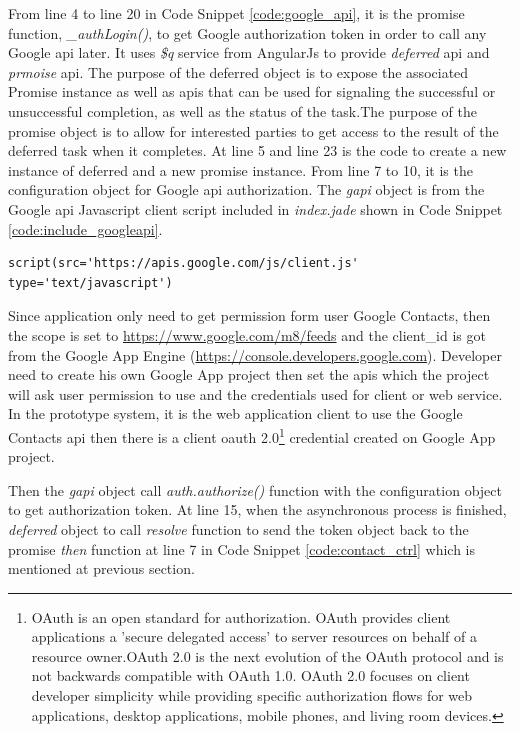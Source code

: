 \par From line 4 to line 20 in Code Snippet \ref{code:google_api}, it is the promise function, \textit{\_authLogin()}, to get Google authorization token in order to call any Google \gls{api} later. It uses \textit{\$q} service from AngularJs to provide \textit{deferred} \gls{api} and \textit{prmoise} \gls{api}. The purpose of the deferred object is to expose the associated Promise instance as well as \gls{api}s that can be used for signaling the successful or unsuccessful completion, as well as the status of the task.The purpose of the promise object is to allow for interested parties to get access to the result of the deferred task when it completes.\cite{angular:q} At line 5 and line 23 is the code to create a new instance of deferred and a new promise instance. From line 7 to 10, it is the configuration object for Google \gls{api} authorization. The \textit{gapi} object is from the Google \gls{api} Javascript client script included in \textit{index.jade} shown in Code Snippet \ref{code:include_googleapi}.

\begin{lstlisting}[caption={Include Google API Javascript file in Index.iade},label={code:include_googleapi}]
script(src='https://apis.google.com/js/client.js' type='text/javascript')
\end{lstlisting}

\par Since application only need to get permission form user Google Contacts, then the scope is set to \url{https://www.google.com/m8/feeds} and the client\_id is got from the Google App Engine (\url{https://console.developers.google.com}). Developer need to create his own Google App project then set the \gls{api}s which the project will ask user permission to use and the credentials used for client or web service. In the prototype system, it is the web application client to use the Google Contacts \gls{api} then there is a client \gls{oauth} 2.0\footnote{OAuth is an open standard for authorization. OAuth provides client applications a 'secure delegated access' to server resources on behalf of a resource owner.OAuth 2.0 is the next evolution of the OAuth protocol and is not backwards compatible with OAuth 1.0. OAuth 2.0 focuses on client developer simplicity while providing specific authorization flows for web applications, desktop applications, mobile phones, and living room devices.\cite{wiki:oauth}} credential created on Google App project.

\par Then the \textit{gapi} object call \textit{auth.authorize()} function with the configuration object to get authorization token. At line 15, when the asynchronous process is finished, \textit{deferred} object to call \textit{resolve} function to send the token object back to the promise \textit{then} function at line 7 in Code Snippet \ref{code:contact_ctrl} which is mentioned at previous section.

